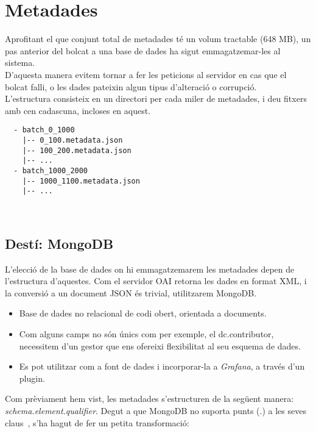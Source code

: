 \section{Metadades}\label{sec:metadata-storing}

Aprofitant el que conjunt total de metadades té un volum tractable (648 MB), un pas anterior del bolcat a una base de dades ha sigut emmagatzemar-les al sistema. \\

\noindent
D’aquesta manera evitem tornar a fer les peticions al servidor en cas que el bolcat falli, o les dades pateixin algun tipus d’alteració o corrupció. \\

\noindent
L’estructura consisteix en un directori per cada miler de metadades, i deu fitxers amb cen cadascuna, incloses en aquest.

\begin{verbatim}
  - batch_0_1000
    |-- 0_100.metadata.json
    |-- 100_200.metadata.json
    |-- ...
  - batch_1000_2000
    |-- 1000_1100.metadata.json
    |-- ...
\end{verbatim}

\noindent \\
\subsection{Destí: MongoDB}\label{subsec:metadata-db-mongodb}

L'elecció de la base de dades on hi emmagatzemarem les metadades depen de l'estructura d'aquestes.
Com el servidor \gls{OAI} retorna les dades en format \gls{XML}, i la conversió a un document \gls{JSON} és trivial, utilitzarem MongoDB.

\begin{itemize}
  \item Base de dades no relacional de codi obert, orientada a documents.
  \item Com alguns camps no són únics com per exemple, el dc.contributor, necessitem d’un gestor que ens ofereixi flexibilitat al seu esquema de dades.
  \item Es pot utilitzar com a font de dades i incorporar-la a \textit{Grafana}, a través d’un \gls{plugin}.
\end{itemize}

\noindent
Com prèviament hem vist, les metadades s’estructuren de la següent manera: \textit{schema.element.qualifier}.
Degut a que MongoDB no suporta punts (.) a les seves claus~\cite{mongodb:key-restrictions}, s’ha hagut de fer un petita transformació:

